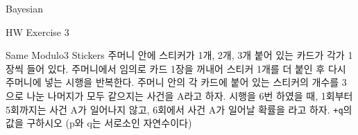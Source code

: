 \begin{edXchapter}{Bayesian}
\begin{edXsection}{HW Exercise 3}
\begin{edXvertical}
\begin{edXproblem}{Same Modulo3 Stickers}
주머니 안에 스티커가 1개, 2개, 3개 붙어 있는 카드가 각가 1장씩 들어 있다. 주머니에서 임의로
카드 1장을 꺼내어 스티커 1개를 더 붙인 후 다시 주머니에 넣는 시행을 반복한다. 주머니 안의
각 카드에 붙어 있는 스티커의 개수를 3으로 나눈 나머지가 모두 같으지는 사건을 A라고 하자.
시행을 6번 하였을 때, 1회부터 5회까지는 사건 A가 일어나지 않고, 6회에서 사건 A가 일어날 
확률을 {\tt\LARGE{}}라고 하자. {\tt\LARGEp+q}의 값을 구하시오 (p와 q는 서로소인 자연수이다)
\end{edXproblem}

\end{edXvertical}
\end{edXsection}
\end{edXchapter}
